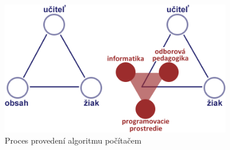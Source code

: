 \documentclass[FP,DP]{tulthesis}
\begin{document}
{{{{{{{\begin{figure}
    \centering
    \includegraphics[width=100mm,scale=0.8]{kalas.png}
\caption{Proces provedení algoritmu počítačem \citep[s.~56]{spirit}} \label{provedeni}
\end{figure}

}}}}}}}
\end{document}
